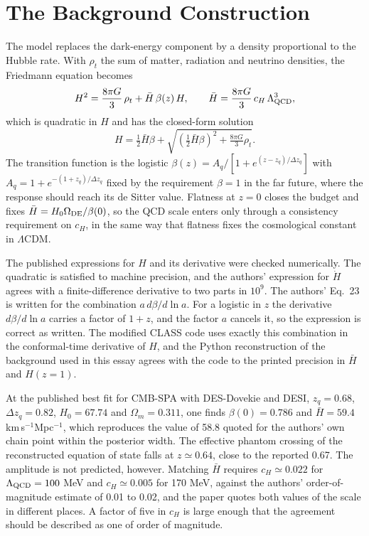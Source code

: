 \documentclass[11pt]{article}
\newcommand{\Hb}{\bar H}
\newcommand{\LQCD}{\Lambda_{\rm QCD}}
\begin{document}
\section{The Background Construction}

The model replaces the dark-energy component by a density proportional to the Hubble rate. With $\rho_t$ the sum of matter, radiation and neutrino densities, the Friedmann equation becomes
\begin{equation}
H^2=\frac{8\pi G}{3}\,\rho_t+\Hb\,\beta(z)\,H,\qquad \Hb=\frac{8\pi G}{3}\,c_H\,\LQCD^3,
\end{equation}
which is quadratic in $H$ and has the closed-form solution
\begin{equation}
H=\tfrac12\Hb\beta+\sqrt{\left(\tfrac12\Hb\beta\right)^2+\tfrac{8\pi G}{3}\rho_t}.
\end{equation}
The transition function is the logistic $\beta(z)=A_q/\left[1+e^{(z-z_q)/\Delta z_q}\right]$ with $A_q=1+e^{-(1+z_q)/\Delta z_q}$ fixed by the requirement $\beta=1$ in the far future, where the response should reach its de Sitter value. Flatness at $z=0$ closes the budget and fixes $\Hb=H_0\Omega_{\rm DE}/\beta(0)$, so the QCD scale enters only through a consistency requirement on $c_H$, in the same way that flatness fixes the cosmological constant in $\Lambda$CDM.

The published expressions for $H$ and its derivative were checked numerically. The quadratic is satisfied to machine precision, and the authors' expression for $\dot H$ agrees with a finite-difference derivative to two parts in $10^{9}$. The authors' Eq.~23 is written for the combination $a\,d\beta/d\ln a$. For a logistic in $z$ the derivative $d\beta/d\ln a$ carries a factor of $1+z$, and the factor $a$ cancels it, so the expression is correct as written. The modified CLASS code uses exactly this combination in the conformal-time derivative of $H$, and the Python reconstruction of the background used in this essay agrees with the code to the printed precision in $\Hb$ and $H(z{=}1)$.

At the published best fit for CMB-SPA with DES-Dovekie and DESI, $z_q=0.68$, $\Delta z_q=0.82$, $H_0=67.74$ and $\Omega_m=0.311$, one finds $\beta(0)=0.786$ and $\Hb=59.4$ km\,s$^{-1}$Mpc$^{-1}$, which reproduces the value of 58.8 quoted for the authors' own chain point within the posterior width. The effective phantom crossing of the reconstructed equation of state falls at $z\simeq0.64$, close to the reported 0.67. The amplitude is not predicted, however. Matching $\Hb$ requires $c_H\simeq0.022$ for $\LQCD=100$ MeV and $c_H\simeq0.005$ for 170 MeV, against the authors' order-of-magnitude estimate of 0.01 to 0.02, and the paper quotes both values of the scale in different places. A factor of five in $c_H$ is large enough that the agreement should be described as one of order of magnitude.
\end{document}
